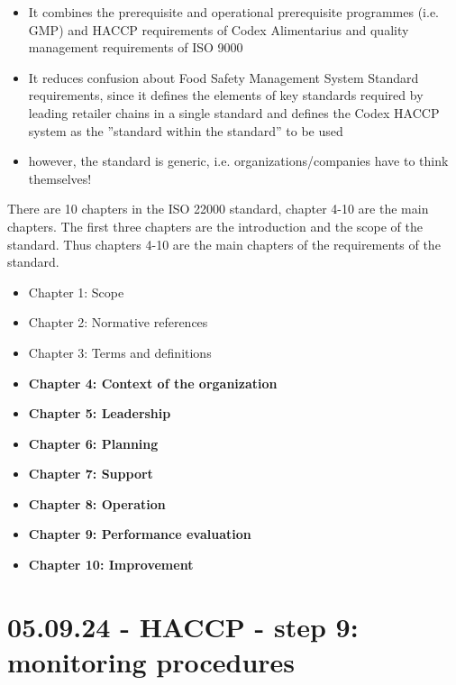 \begin{highlight}
    \begin{itemize}
        \item It combines the prerequisite and operational prerequisite
        programmes (i.e. GMP) and HACCP requirements of Codex
        Alimentarius and quality management requirements of ISO 9000
        \item It reduces confusion about Food Safety Management System
        Standard requirements, since it defines the elements of key
        standards required by leading retailer chains in a single standard
        and defines the Codex HACCP system as the ”standard within the
        standard” to be used
        \item however, the standard is generic, i.e. organizations/companies have to think themselves!
    \end{itemize}
\end{highlight}

There are 10 chapters in the ISO 22000 standard, chapter 4-10 are the main chapters. The first three chapters are the introduction and the scope of the standard. Thus chapters 4-10 are the main chapters of the requirements of the standard.

\begin{highlight}
    \begin{itemize}
        \item Chapter 1: Scope
        \item Chapter 2: Normative references
        \item Chapter 3: Terms and definitions
        \item \textbf{Chapter 4: Context of the organization}
        \item \textbf{Chapter 5: Leadership}
        \item \textbf{Chapter 6: Planning}
        \item \textbf{Chapter 7: Support}
        \item \textbf{Chapter 8: Operation}
        \item \textbf{Chapter 9: Performance evaluation}
        \item \textbf{Chapter 10: Improvement}
    \end{itemize}
\end{highlight}

\section{05.09.24 - HACCP - step 9: monitoring procedures}

